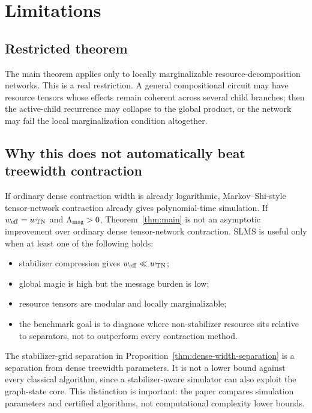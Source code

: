 \section{Limitations}
\label{sec:limitations}

\subsection{Restricted theorem}

The main theorem applies only to locally marginalizable resource-decomposition networks. This is a real restriction. A general compositional circuit may have resource tensors whose effects remain coherent across several child branches; then the active-child recurrence may collapse to the global product, or the network may fail the local marginalization condition altogether.

\subsection{Why this does not automatically beat treewidth contraction}

If ordinary dense contraction width is already logarithmic, Markov--Shi-style tensor-network contraction already gives polynomial-time simulation. If \(w_{\mathrm{eff}}=w_{\mathrm{TN}}\) and \(\Lambda_{\mathrm{msg}}>0\), Theorem~\ref{thm:main} is not an asymptotic improvement over ordinary dense tensor-network contraction. SLMS is useful only when at least one of the following holds:
\begin{itemize}[leftmargin=1.2cm]
\item stabilizer compression gives \(w_{\mathrm{eff}}\ll w_{\mathrm{TN}}\);
\item global magic is high but the message burden is low;
\item resource tensors are modular and locally marginalizable;
\item the benchmark goal is to diagnose where non-stabilizer resource sits relative to separators, not to outperform every contraction method.
\end{itemize}

The stabilizer-grid separation in Proposition~\ref{thm:dense-width-separation} is a separation from dense treewidth parameters. It is not a lower bound against every classical algorithm, since a stabilizer-aware simulator can also exploit the graph-state core. This distinction is important: the paper compares simulation parameters and certified algorithms, not computational complexity lower bounds.

